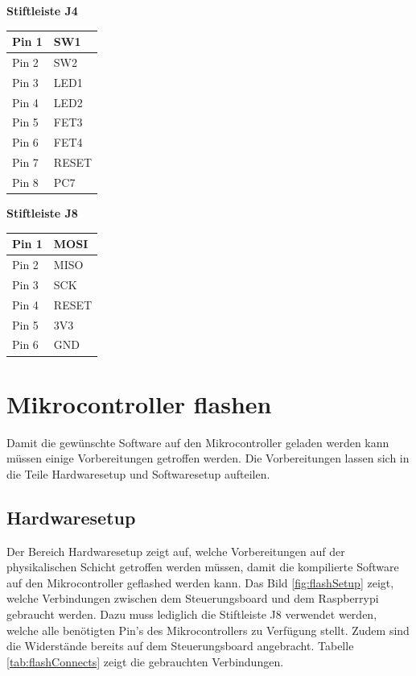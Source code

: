 \documentclass[11pt]{article}
\begin{document}
\begin{minipage}[t]{0.3\textwidth}
	\begin{flushleft}
		\textbf{Stiftleiste J4}
	\end{flushleft}
	\begin{tabular}{l|l}
		Pin 1	&	SW1\\\hline
		Pin 2	&	SW2\\\hline
		Pin 3	&  LED1	\\\hline
		Pin 4	&  LED2\\\hline
		Pin 5	&	FET3	\\\hline
		Pin 6	&	FET4	\\\hline
		Pin 7	&	RESET\\\hline
		Pin 8	&	PC7
	\end{tabular}
	\begin{flushleft}
		\textbf{Stiftleiste J8}
	\end{flushleft}
	\begin{tabular}{l|l}
		Pin 1	&	MOSI\\\hline
		Pin 2	&	MISO\\\hline
		Pin 3	&	SCK\\\hline
		Pin 4	&	RESET\\\hline
		Pin 5	&	3V3\\\hline
		Pin 6	&	GND
	\end{tabular}
\end{minipage}
\newpage

\section{Mikrocontroller flashen}
Damit die gewünschte Software auf den Mikrocontroller geladen werden kann müssen einige Vorbereitungen getroffen werden. Die Vorbereitungen lassen sich in die Teile Hardwaresetup und Softwaresetup aufteilen.
\subsection{Hardwaresetup}
Der Bereich Hardwaresetup zeigt auf, welche Vorbereitungen auf der physikalischen Schicht getroffen werden müssen, damit die kompilierte Software auf den Mikrocontroller geflashed werden kann.
Das Bild \ref{fig:flashSetup} zeigt, welche Verbindungen zwischen dem Steuerungsboard und dem Raspberrypi gebraucht werden. Dazu muss lediglich die Stiftleiste J8 verwendet werden, welche alle benötigten Pin's des Mikrocontrollers zu Verfügung stellt. Zudem sind die Widerstände bereits auf dem Steuerungsboard angebracht. Tabelle \ref{tab:flashConnects} zeigt die gebrauchten Verbindungen.
\end{document}

